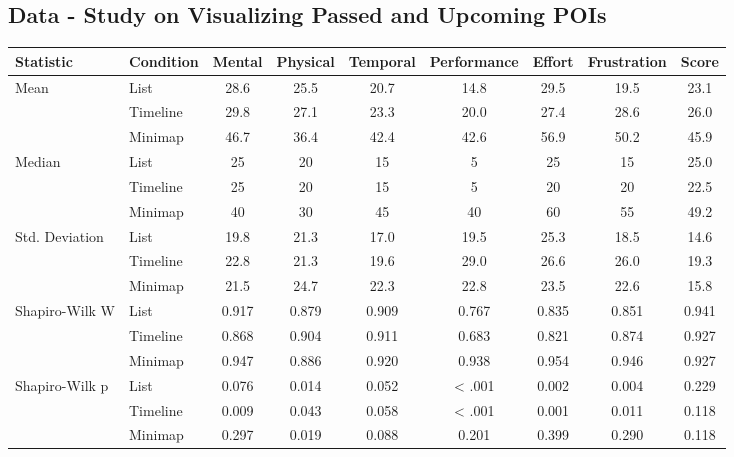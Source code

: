 \clearpage
\subsection{Data - Study on Visualizing Passed and Upcoming POIs}

\begin{center}
    \begin{minipage}{\textwidth}

        \centering
        \begin{tabular}{llccccccc}
            \toprule
            \textbf{Statistic} & \textbf{Condition} & \textbf{Mental} & \textbf{Physical} & \textbf{Temporal} & \textbf{Performance} & \textbf{Effort} & \textbf{Frustration} & \textbf{Score} \\
            \midrule
            \multirow{3}{*}{Mean} & List & 28.6 & 25.5 & 20.7 & 14.8 & 29.5 & 19.5 & 23.1 \\
            & Timeline & 29.8 & 27.1 & 23.3 & 20.0 & 27.4 & 28.6 & 26.0 \\
            & Minimap & 46.7 & 36.4 & 42.4 & 42.6 & 56.9 & 50.2 & 45.9 \\
            \midrule
            \multirow{3}{*}{Median} & List & 25 & 20 & 15 & 5 & 25 & 15 & 25.0 \\
            & Timeline & 25 & 20 & 15 & 5 & 20 & 20 & 22.5 \\
            & Minimap & 40 & 30 & 45 & 40 & 60 & 55 & 49.2 \\
            \midrule
            \multirow{3}{1.5cm}{Std. Deviation} & List & 19.8 & 21.3 & 17.0 & 19.5 & 25.3 & 18.5 & 14.6 \\
            & Timeline & 22.8 & 21.3 & 19.6 & 29.0 & 26.6 & 26.0 & 19.3 \\
            & Minimap & 21.5 & 24.7 & 22.3 & 22.8 & 23.5 & 22.6 & 15.8 \\
            \midrule
            \multirow{3}{1.5cm}{Shapiro-Wilk W} & List & 0.917 & 0.879 & 0.909 & 0.767 & 0.835 & 0.851 & 0.941 \\
            & Timeline & 0.868 & 0.904 & 0.911 & 0.683 & 0.821 & 0.874 & 0.927 \\
            & Minimap & 0.947 & 0.886 & 0.920 & 0.938 & 0.954 & 0.946 & 0.927 \\
            \midrule
            \multirow{3}{1.5cm}{Shapiro-Wilk p} & List & 0.076 & 0.014 & 0.052 & < .001 & 0.002 & 0.004 & 0.229 \\
            & Timeline & 0.009 & 0.043 & 0.058 & < .001 & 0.001 & 0.011 & 0.118 \\
            & Minimap & 0.297 & 0.019 & 0.088 & 0.201 & 0.399 & 0.290 & 0.118 \\
            \bottomrule
        \end{tabular}



\end{minipage}
\end{center}
